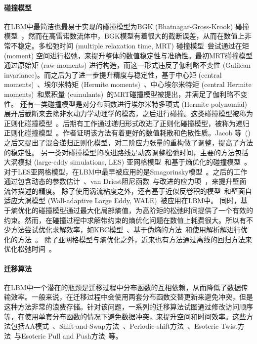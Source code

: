 \paragraph{碰撞模型}
在LBM中最简洁也最易于实现的碰撞模型为BGK (Bhatnagar-Gross-Krook) 碰撞模型~\cite{Bhatnagar-1954, Chen-1998}，然而在高雷诺数流体中，BGK模型有着很大的截断误差，从而在数值上非常不稳定。多松弛时间 (multiple relaxation time, MRT) 碰撞模型~\cite{dHumieres-1992, Lallemand-2000, Coveney-2002}尝试通过在矩 (moment) 空间进行松弛，来提升整体的数值稳定性与准确性。最初MRT碰撞模型通过原始矩 (raw moments) 进行构造，而这一形式违反了伽利略不变性 (Galilean invariance)。而之后为了进一步提升精度与稳定性，基于中心矩 (central moments)~\cite{Geier-2006, Geier-2009}、埃尔米特矩 (Hermite moments)~\cite{Shan-2007, Chen-2014, Adhikari-2008}、中心埃尔米特矩 (central Hermite moments)~\cite{Mattila-2017, Shan-2019}和累积量 (cumulants)~\cite{Geier-2015, Geier-2017}的MRT碰撞模型被提出，并满足了伽利略不变性。
还有一类碰撞模型是对分布函数进行埃尔米特多项式 (Hermite polynomial) 展开后截断来去除非水动力学动理学的模态，之后进行碰撞。这类碰撞模型被称为正则化碰撞模型~\cite{Zhang-2006, Latt-2006}。后期有工作通过递归形式改进了正则化碰撞模型，被称为递归正则化碰撞模型~\cite{Malaspinas-2015, Coreixas-2017}。作者证明该方法有着更好的数值耗散和色散性质。Jacob 等~(\citeyear{Jacob-2018}) 之后又提出了混合递归正则化模型，对二阶应力张量的重构做了调整，提高了方法的稳定性。
另一类对碰撞模型的改进路线是动态调整松弛时间，主要的方法包括大涡模拟 (large-eddy simulations, LES) 亚网格模型~\cite{Eggels-1996, Sagaut-2010}和基于熵优化的碰撞模型~\cite{Karlin-1999, Ansumali-2003}。
对于LES亚网格模型，在LBM中最早被应用的是Smagorinsky模型~\cite{Hou-1994, Krafczyk-2003}。之后的工作通过包含动态的参数估计~\cite{Premnath-2009}、van Driest阻尼函数~\cite{Malaspinas-2014}与改进的应力项~\cite{Leveque-2007}，来提升壁面流体描述的精度。
除了使用涡流粘度之外，还有基于近似反卷积的模型~\cite{Malaspinas-2011, Nathen-2018}和壁面自适应大涡模型 (Wall-adaptive Large Eddy, WALE)~\cite{Weickert-2010}被应用在LBM中。
同时，基于熵优化的碰撞模型通过最大化局部熵值，为高阶矩的松弛时间提供了一个有效的约束。然而，在碰撞过程中求解带约束的熵优化问题在数值上耗费很大。所以有不少方法尝试优化求解效率，如KBC模型~\cite{Karlin-2014}、基于伪熵的方法~\cite{Kramer-2019}和使用解析解进行优化的方法~\cite{Tang-2022}。
除了亚网格模型与熵优化之外，近来也有方法通过离线的回归方法来优化松弛时间~\cite{Li-2020}。

\paragraph{迁移算法}
在LBM中一个潜在的瓶颈是迁移过程中分布函数的互相依赖，从而降低了数据传输效率。一般来说，在迁移过程中会使用两套分布函数交替更新来避免冲突，但是这种方法非常的浪费存储。针对该问题，一系列的迁移算法试图通过修改访问顺序等，在使用单套分布函数的情况下避免数据冲突，来提升空间和时间效率。这些方法包括AA模式~\citet{Bailey-2009}、Shift-and-Swap方法~\cite{Mohrhard-2019}、Periodic-shift方法~\cite{Adrian-2023}、Esoteric Twist方法~\cite{Geier-2017-c}与Esoteric Pull and Push方法~\cite{Moritz-2022}等。

